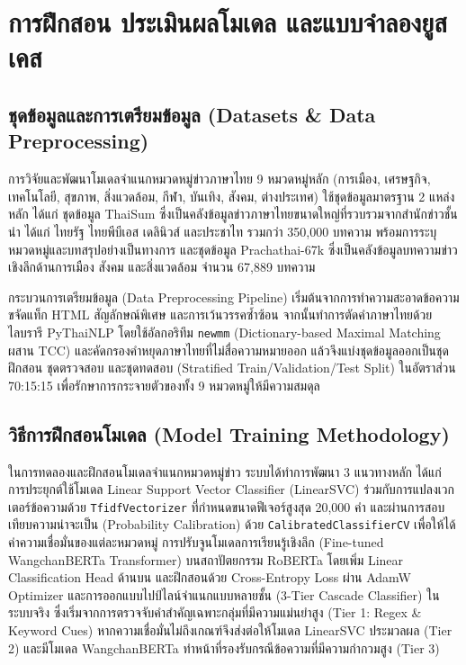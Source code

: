 
\section{การฝึกสอน ประเมินผลโมเดล และแบบจำลองยูสเคส}

\subsection{ชุดข้อมูลและการเตรียมข้อมูล (Datasets \& Data Preprocessing)}

การวิจัยและพัฒนาโมเดลจำแนกหมวดหมู่ข่าวภาษาไทย 9 หมวดหมู่หลัก (การเมือง, เศรษฐกิจ, เทคโนโลยี, สุขภาพ, สิ่งแวดล้อม, กีฬา, บันเทิง, สังคม, ต่างประเทศ) ใช้ชุดข้อมูลมาตรฐาน 2 แหล่งหลัก ได้แก่ ชุดข้อมูล ThaiSum ซึ่งเป็นคลังข้อมูลข่าวภาษาไทยขนาดใหญ่ที่รวบรวมจากสำนักข่าวชั้นนำ ได้แก่ ไทยรัฐ ไทยพีบีเอส เดลินิวส์ และประชาไท รวมกว่า 350,000 บทความ พร้อมการระบุหมวดหมู่และบทสรุปอย่างเป็นทางการ และชุดข้อมูล Prachathai-67k ซึ่งเป็นคลังข้อมูลบทความข่าวเชิงลึกด้านการเมือง สังคม และสิ่งแวดล้อม จำนวน 67,889 บทความ


กระบวนการเตรียมข้อมูล (Data Preprocessing Pipeline) เริ่มต้นจากการทำความสะอาดข้อความ ขจัดแท็ก HTML สัญลักษณ์พิเศษ และการเว้นวรรคซ้ำซ้อน จากนั้นทำการตัดคำภาษาไทยด้วยไลบรารี PyThaiNLP โดยใช้อัลกอริทึม \texttt{newmm} (Dictionary-based Maximal Matching ผสาน TCC) และคัดกรองคำหยุดภาษาไทยที่ไม่สื่อความหมายออก แล้วจึงแบ่งชุดข้อมูลออกเป็นชุดฝึกสอน ชุดตรวจสอบ และชุดทดสอบ (Stratified Train/Validation/Test Split) ในอัตราส่วน 70:15:15 เพื่อรักษาการกระจายตัวของทั้ง 9 หมวดหมู่ให้มีความสมดุล

\subsection{วิธีการฝึกสอนโมเดล (Model Training Methodology)}

ในการทดลองและฝึกสอนโมเดลจำแนกหมวดหมู่ข่าว ระบบได้ทำการพัฒนา 3 แนวทางหลัก ได้แก่ การประยุกต์ใช้โมเดล Linear Support Vector Classifier (LinearSVC) ร่วมกับการแปลงเวกเตอร์ข้อความด้วย \texttt{TfidfVectorizer} ที่กำหนดขนาดฟีเจอร์สูงสุด 20,000 คำ และผ่านการสอบเทียบความน่าจะเป็น (Probability Calibration) ด้วย \texttt{CalibratedClassifierCV} เพื่อให้ได้ค่าความเชื่อมั่นของแต่ละหมวดหมู่ การปรับจูนโมเดลการเรียนรู้เชิงลึก (Fine-tuned WangchanBERTa Transformer) บนสถาปัตยกรรม RoBERTa โดยเพิ่ม Linear Classification Head ด้านบน และฝึกสอนด้วย Cross-Entropy Loss ผ่าน AdamW Optimizer และการออกแบบไปป์ไลน์จำแนกแบบหลายชั้น (3-Tier Cascade Classifier) ในระบบจริง ซึ่งเริ่มจากการตรวจจับคำสำคัญเฉพาะกลุ่มที่มีความแม่นยำสูง (Tier 1: Regex \& Keyword Cues) หากความเชื่อมั่นไม่ถึงเกณฑ์จึงส่งต่อให้โมเดล LinearSVC ประมวลผล (Tier 2) และมีโมเดล WangchanBERTa ทำหน้าที่รองรับกรณีข้อความที่มีความกำกวมสูง (Tier 3)

